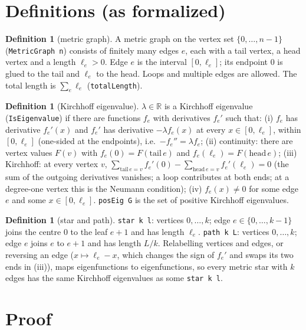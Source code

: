 \documentclass[11pt]{article}
\theoremstyle{definition}
\newtheorem{definition}[theorem]{Definition}
\theoremstyle{remark}
\begin{document}
\section{Definitions (as formalized)}

\begin{definition}[metric graph]
A metric graph on the vertex set $\{0,\dots,n-1\}$ (\texttt{MetricGraph n}) consists of finitely
many edges $e$, each with a tail vertex, a head vertex and a length $\ell_e>0$. Edge $e$ is the
interval $[0,\ell_e]$; its endpoint $0$ is glued to the tail and $\ell_e$ to the head. Loops and
multiple edges are allowed. The total length is $\sum_e\ell_e$ (\texttt{totalLength}).
\end{definition}

\begin{definition}[Kirchhoff eigenvalue]
$\lambda\in\mathbb{R}$ is a Kirchhoff eigenvalue (\texttt{IsEigenvalue}) if there are functions $f_e$
with derivatives $f_e'$ such that: (i) $f_e$ has derivative $f_e'(x)$ and $f_e'$ has derivative
$-\lambda f_e(x)$ at every $x\in[0,\ell_e]$, within $[0,\ell_e]$ (one-sided at the endpoints), i.e.\
$-f_e''=\lambda f_e$; (ii) continuity: there are vertex values $F(v)$ with $f_e(0)=F(\mathrm{tail}\,e)$
and $f_e(\ell_e)=F(\mathrm{head}\,e)$; (iii) Kirchhoff: at every vertex $v$,
$\sum_{\mathrm{tail}\,e=v}f_e'(0)-\sum_{\mathrm{head}\,e=v}f_e'(\ell_e)=0$ (the sum of the outgoing
derivatives vanishes; a loop contributes at both ends; at a degree-one vertex this is the Neumann
condition); (iv) $f_e(x)\ne 0$ for some edge $e$ and some $x\in[0,\ell_e]$. \texttt{posEig G} is the
set of positive Kirchhoff eigenvalues.
\end{definition}

\begin{definition}[star and path]
\texttt{star k l}: vertices $0,\dots,k$; edge $e\in\{0,\dots,k-1\}$ joins the centre $0$ to the leaf
$e+1$ and has length $\ell_e$. \texttt{path k L}: vertices $0,\dots,k$; edge $e$ joins $e$ to $e+1$ and
has length $L/k$. Relabelling vertices and edges, or reversing an edge ($x\mapsto\ell_e-x$, which
changes the sign of $f_e'$ and swaps its two ends in (iii)), maps eigenfunctions to eigenfunctions, so
every metric star with $k$ edges has the same Kirchhoff eigenvalues as some \texttt{star k l}.
\end{definition}

\section{Proof}
\end{document}
